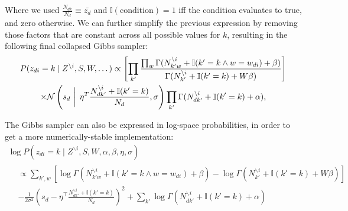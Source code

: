 \documentclass{article} %
\begin{document}
Where we used $ \frac{N_{dk}}{N_d} \equiv \bar{z_d} $ and $\mathbb{I}(\text{condition}) = 1$ iff the condition evaluates to true, and zero otherwise. We can further simplify the previous expression by removing those factors that are constant across all possible values for $k$, resulting in the following final collapsed Gibbs sampler:
\begin{equation}
\begin{gathered}
P(z_{di} = k \mid Z^{\backslash{i}}, S, W, \dots) \propto \left[ \prod_{k'} \frac{\prod_w \Gamma(N_{{k'}w}^{\backslash i} + \mathbb{I}(k' = k \wedge w = w_{di}) + \beta)}{\Gamma(N_{k'}^{\backslash i} + \mathbb{I}(k' = k) + W \beta)} \right]  \\
\times \mathcal{N}\left(s_d\, \left| \vphantom{\frac{1}{1}} \right. \, \eta^T \frac{N_{d{k'}}^{\backslash i} + \mathbb{I}(k' = k)}{N_d}, \sigma \right) \prod_{k'} \Gamma(N_{d{k'}}^{\backslash i} + \mathbb{I}(k' = k) + \alpha),
\end{gathered}
\end{equation}

The Gibbs sampler can also be expressed in log-space probabilities, in order to get a more numerically-stable implementation:
\begin{equation*}
\begin{gathered}
\log P(z_{di} = k \mid Z^{\backslash{i}}, S, W, \alpha, \beta, \eta, \sigma)\\
\begin{aligned}
&\propto\sum_{k',w} \left[ \log \Gamma(N_{{k'}w}^{\backslash i} + \mathbb{I}(k' = k \wedge w = w_{di}) + \beta) - \log \Gamma(N_{k'}^{\backslash i} + \mathbb{I}(k' = k) + W \beta) \right]\\
&-\frac{1}{2 \sigma^2}\left(s_d - \eta^\top \frac{N_{d{k'}}^{\backslash i} + \mathbb{I}(k' = k)}{N_d}\right)^2 + \sum_{k'} \log \Gamma(N_{d{k'}}^{\backslash i} + \mathbb{I}(k' = k) + \alpha)
\end{aligned}
\end{gathered}
\end{equation*}
\end{document}
